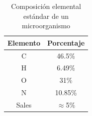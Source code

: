 \begin{table}[H]
\centering
\caption{Composición elemental estándar de un microorganismo}
\label{tab:comp_est_micro}
\begin{threeparttable}
{
\begin{tabular}{cc}\hline
    
    \bfseries{Elemento} & \bfseries{Porcentaje} \\ \hline
    
    C & 46.5\% \\
    H & 6.49\% \\
    O & 31\% \\
    N & 10.85\% \\
    Sales & $\approx$5\% \\
    
    \hline
\end{tabular}
}
\begin{tablenotes}
    \item[] 
\end{tablenotes}
\end{threeparttable}
\end{table}